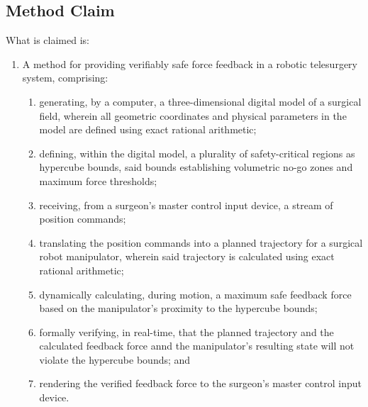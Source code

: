 \documentclass{article}
\begin{document}
\subsection{Method Claim}
\noindent What is claimed is:
\begin{enumerate}
    \item A method for providing verifiably safe force feedback in a robotic telesurgery system, comprising:
    \begin{enumerate}
        \item[(a)] generating, by a computer, a three-dimensional digital model of a surgical field, wherein all geometric coordinates and physical parameters in the model are defined using exact rational arithmetic;
        \item[(b)] defining, within the digital model, a plurality of safety-critical regions as hypercube bounds, said bounds establishing volumetric no-go zones and maximum force thresholds;
        \item[(c)] receiving, from a surgeon's master control input device, a stream of position commands;
        \item[(d)] translating the position commands into a planned trajectory for a surgical robot manipulator, wherein said trajectory is calculated using exact rational arithmetic;
        \item[(e)] dynamically calculating, during motion, a maximum safe feedback force based on the manipulator's proximity to the hypercube bounds;
        \item[(f)] formally verifying, in real-time, that the planned trajectory and the calculated feedback force annd the manipulator's resulting state will not violate the hypercube bounds; and
        \item[(g)] rendering the verified feedback force to the surgeon's master control input device.
    \end{enumerate}
\end{enumerate}
\end{document}
